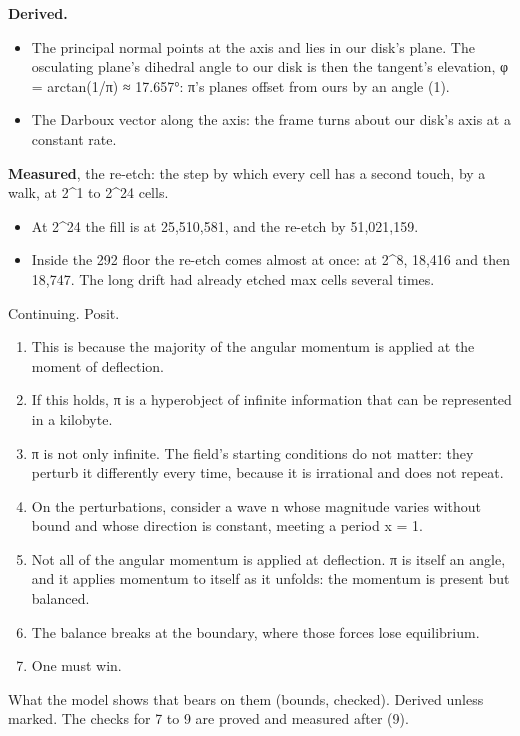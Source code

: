 \textbf{Derived.}

\begin{itemize}
\item The principal normal points at the axis and lies in our disk's plane. The osculating plane's dihedral angle to our disk is then the tangent's elevation, φ = arctan(1/π) ≈ 17.657°: π's planes offset from ours by an angle (1).
\item The Darboux vector along the axis: the frame turns about our disk's axis at a constant rate.
\end{itemize}

\textbf{Measured}, the re-etch: the step by which every cell has a second touch, by a walk, at 2\textasciicircum{}1 to 2\textasciicircum{}24 cells.

\begin{itemize}
\item At 2\textasciicircum{}24 the fill is at 25,510,581, and the re-etch by 51,021,159.
\item Inside the 292 floor the re-etch comes almost at once: at 2\textasciicircum{}8, 18,416 and then 18,747. The long drift had already etched max cells several times.
\end{itemize}

Continuing. Posit.

\begin{enumerate}
\item This is because the majority of the angular momentum is applied at the moment of deflection.
\item If this holds, π is a hyperobject of infinite information that can be represented in a kilobyte.
\item π is not only infinite. The field's starting conditions do not matter: they perturb it differently every time, because it is irrational and does not repeat.
\item On the perturbations, consider a wave n whose magnitude varies without bound and whose direction is constant, meeting a period x = 1.
\item Not all of the angular momentum is applied at deflection. π is itself an angle, and it applies momentum to itself as it unfolds: the momentum is present but balanced.
\item The balance breaks at the boundary, where those forces lose equilibrium.
\item One must win.
\end{enumerate}

What the model shows that bears on them (bounds, checked). Derived unless marked. The checks for 7 to 9 are proved and measured after (9).

